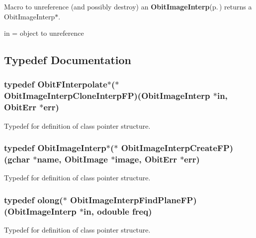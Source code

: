 Macro to unreference (and possibly destroy) an {\bf Obit\-Image\-Interp}{\rm (p.\,\pageref{structObitImageInterp})} returns a Obit\-Image\-Interp$\ast$. 

in = object to unreference 

\subsection{Typedef Documentation}
\subsubsection{\setlength{\rightskip}{0pt plus 5cm}typedef {\bf Obit\-FInterpolate}$\ast$($\ast$ {\bf Obit\-Image\-Interp\-Clone\-Interp\-FP})({\bf Obit\-Image\-Interp} $\ast$in, {\bf Obit\-Err} $\ast$err)}\label{ObitImageInterp_8h_a7}


Typedef for definition of class pointer structure. 

\subsubsection{\setlength{\rightskip}{0pt plus 5cm}typedef {\bf Obit\-Image\-Interp}$\ast$($\ast$ {\bf Obit\-Image\-Interp\-Create\-FP})(gchar $\ast$name, {\bf Obit\-Image} $\ast$image, {\bf Obit\-Err} $\ast$err)}\label{ObitImageInterp_8h_a3}


Typedef for definition of class pointer structure. 

\subsubsection{\setlength{\rightskip}{0pt plus 5cm}typedef {\bf olong}($\ast$ {\bf Obit\-Image\-Interp\-Find\-Plane\-FP})({\bf Obit\-Image\-Interp} $\ast$in, {\bf odouble} freq)}\label{ObitImageInterp_8h_a6}


Typedef for definition of class pointer structure. 

